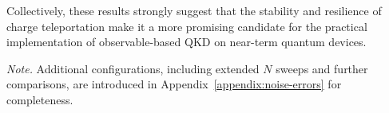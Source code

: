 Collectively, these results strongly suggest that the stability and resilience of charge teleportation make it a more promising candidate for the practical implementation of observable-based QKD on near-term quantum devices.

\medskip
\noindent\emph{Note.} Additional configurations, including extended \(N\) sweeps and further comparisons, are introduced in Appendix~\ref{appendix:noise-errors} for completeness.
